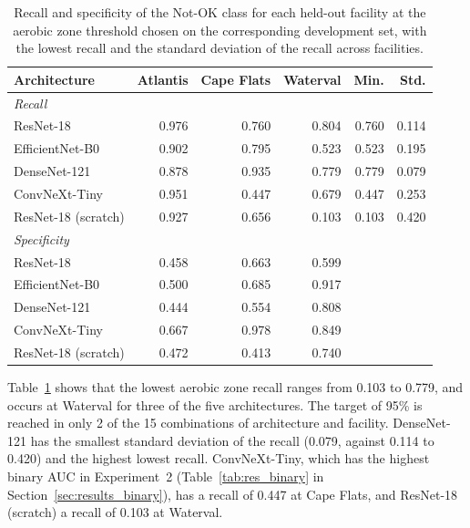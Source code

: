 \begin{table}[htbp]
\centering
\caption{Recall and specificity of the Not-OK class for each held-out facility at the aerobic zone threshold chosen on the corresponding development set, with the lowest recall and the standard deviation of the recall across facilities.}
\label{tab:res_threshold_robustness_aerobic}
\begin{tabular}{l rrr rr}
\toprule
\textbf{Architecture} & \textbf{Atlantis} & \textbf{Cape Flats} & \textbf{Waterval} & \textbf{Min.} & \textbf{Std.} \\
\midrule
\multicolumn{6}{l}{\textit{Recall}} \\
ResNet-18 & 0.976 & 0.760 & 0.804 & 0.760 & 0.114 \\
EfficientNet-B0 & 0.902 & 0.795 & 0.523 & 0.523 & 0.195 \\
DenseNet-121 & 0.878 & 0.935 & 0.779 & 0.779 & 0.079 \\
ConvNeXt-Tiny & 0.951 & 0.447 & 0.679 & 0.447 & 0.253 \\
ResNet-18 (scratch) & 0.927 & 0.656 & 0.103 & 0.103 & 0.420 \\
\midrule
\multicolumn{6}{l}{\textit{Specificity}} \\
ResNet-18 & 0.458 & 0.663 & 0.599 \\
EfficientNet-B0 & 0.500 & 0.685 & 0.917 \\
DenseNet-121 & 0.444 & 0.554 & 0.808 \\
ConvNeXt-Tiny & 0.667 & 0.978 & 0.849 \\
ResNet-18 (scratch) & 0.472 & 0.413 & 0.740 \\
\bottomrule
\end{tabular}
\end{table}

Table~\ref{tab:res_threshold_robustness_aerobic} shows that the lowest aerobic zone recall ranges from 0.103 to 0.779, and occurs at Waterval for three of the five architectures. The target of 95\% is reached in only 2 of the 15 combinations of architecture and facility. DenseNet-121 has the smallest standard deviation of the recall (0.079, against 0.114 to 0.420) and the highest lowest recall. ConvNeXt-Tiny, which has the highest binary AUC in Experiment~2 (Table~\ref{tab:res_binary} in Section~\ref{sec:results_binary}), has a recall of 0.447 at Cape Flats, and ResNet-18 (scratch) a recall of 0.103 at Waterval.

\FloatBarrier